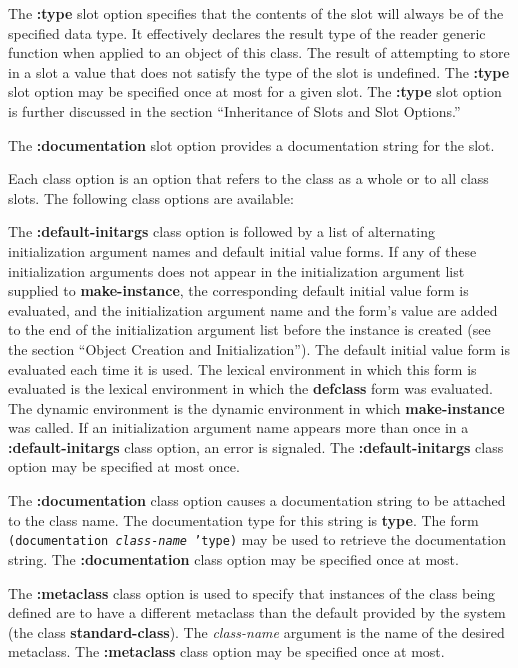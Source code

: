 \item{\bull}
The {\bf :type} slot option specifies that the contents of the slot
will always be of the specified data type.  It effectively declares
the result type of the reader generic function when applied to an
object of this class.  The result of attempting to store in a slot a
value that does not satisfy the type of the slot is undefined.  The
{\bf :type} slot option may be specified once at most for a given
slot.  The {\bf :type} slot option is further discussed in the section
``Inheritance of Slots and Slot Options.''

\item{\bull}
The {\bf :documentation} slot option provides a documentation string
for the slot.
\endlist

Each class option is an option that refers to the class as a whole
or to all class slots.  The following class options are available:

\beginlist
\item{\bull}
The {\bf :default-initargs} class option is followed by a list of
alternating initialization argument names and default initial value
forms.  If any of these initialization arguments does not appear in
the initialization argument list supplied to {\bf make-instance}, the
corresponding default initial value form is evaluated, and the
initialization argument name and the form's value are added to the end
of the initialization argument list before the instance is created
(see the section ``Object Creation and Initialization'').  The default
initial value form is evaluated each time it is used.  The lexical
environment in which this form is evaluated is the lexical environment
in which the {\bf defclass} form was evaluated.  The dynamic
environment is the dynamic environment in which {\bf make-instance}
was called.  If an initialization argument name appears more than once
in a {\bf :default-initargs} class option, an error is signaled.  The
{\bf :default-initargs} class option may be specified at most once.


\item{\bull} 
The {\bf :documentation} class option causes a documentation string to be
attached to the class name.  The documentation type for this string is
{\bf type}.  The form {\tt (documentation {\it class-name\/} 'type)}
may be used to retrieve the documentation string.  The {\bf
:documentation} class option may be specified once at most.

\item{\bull}
The {\bf :metaclass} class option is used to specify that instances of the
class being defined are to have a different metaclass than the default
provided by the system (the class {\bf standard-class}).  The {\it
class-name} argument is the name of the desired metaclass.  The {\bf
:metaclass} class option may be specified once at most.

